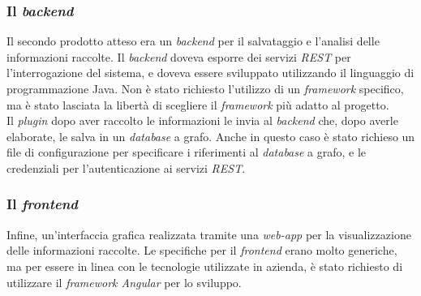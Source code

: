 \subsubsection*{Il \textit{backend}}
Il secondo prodotto atteso era un \textit{backend} per il salvataggio e l'analisi delle informazioni raccolte. 
Il \textit{backend} doveva esporre dei servizi \textit{REST} per l'interrogazione del sistema, e doveva essere sviluppato utilizzando
il linguaggio di programmazione Java. Non è stato richiesto l'utilizzo di un \textit{framework} specifico, ma è stato lasciata
la libertà di scegliere il \textit{framework} più adatto al progetto.\\
Il \textit{plugin} dopo aver raccolto le informazioni
le invia al \textit{backend} che,  dopo averle elaborate, le salva in un \textit{database} a grafo.
Anche in questo caso è stato richieso un file di configurazione per specificare i riferimenti al \textit{database} a grafo, e le credenziali
per l'autenticazione ai servizi \textit{REST}.\\

\subsubsection*{Il \textit{frontend}}
Infine, un'interfaccia grafica realizzata tramite una \textit{web-app} per la visualizzazione delle informazioni raccolte.
Le specifiche per il \textit{frontend} erano molto generiche, ma per essere in linea con le tecnologie utilizzate in azienda,
è stato richiesto di utilizzare il \textit{framework Angular} per lo sviluppo.\\
